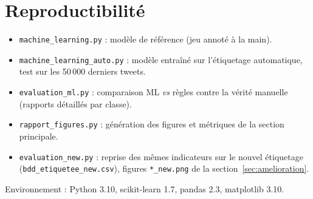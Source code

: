 \documentclass[11pt,a4paper]{article}
\begin{document}
\appendix
\section{Reproductibilité}
\begin{itemize}
  \item \texttt{machine\_learning.py} : modèle de référence (jeu annoté à la main).
  \item \texttt{machine\_learning\_auto.py} : modèle entraîné sur l'étiquetage
        automatique, test sur les 50\,000 derniers tweets.
  \item \texttt{evaluation\_ml.py} : comparaison ML \emph{vs} règles contre la
        vérité manuelle (rapports détaillés par classe).
  \item \texttt{rapport\_figures.py} : génération des figures et métriques de la
        section principale.
  \item \texttt{evaluation\_new.py} : reprise des mêmes indicateurs sur le nouvel
        étiquetage (\texttt{bdd\_etiquetee\_new.csv}), figures \texttt{*\_new.png}
        de la section~\ref{sec:amelioration}.
\end{itemize}
Environnement : Python 3.10, scikit-learn 1.7, pandas 2.3, matplotlib 3.10.
\end{document}
